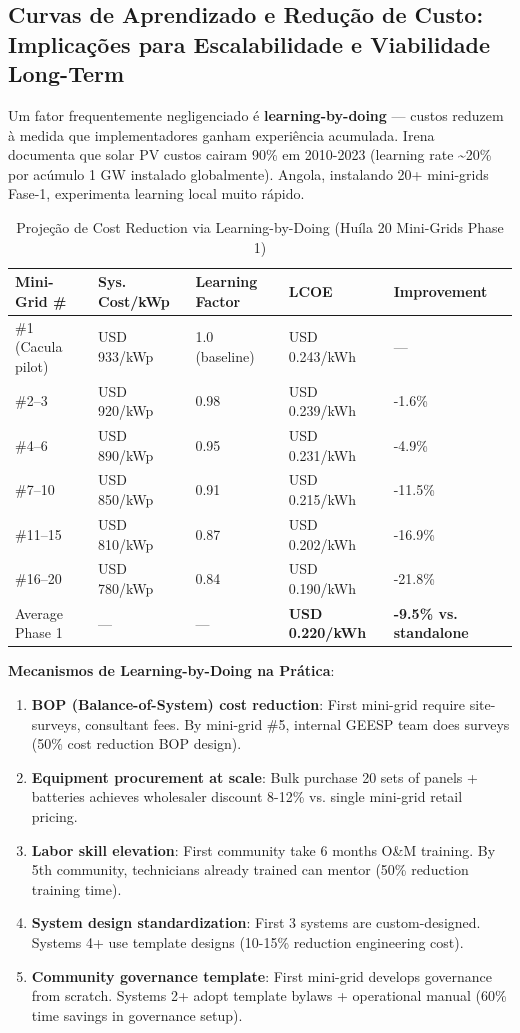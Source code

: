 \documentclass[12pt, a4paper]{article}
\begin{document}
\subsection{Curvas de Aprendizado e Redução de Custo: Implicações para Escalabilidade e Viabilidade Long-Term}

Um fator frequentemente negligenciado é \textbf{learning-by-doing} — custos reduzem à medida que implementadores ganham experiência acumulada. Irena~\citep{IRENA2023a} documenta que solar PV custos cairam 90\% em 2010-2023 (learning rate \textasciitilde 20\% por acúmulo 1 GW instalado globalmente). Angola, instalando 20+ mini-grids Fase-1, experimenta learning local muito rápido.

\begin{table}[H]
\centering
\caption{Projeção de Cost Reduction via Learning-by-Doing (Huíla 20 Mini-Grids Phase 1)}
\label{tab:learning_curve}
\small
\begin{tabular}{|l|l|l|l|l|}
\hline
\textbf{Mini-Grid \#} & \textbf{Sys. Cost/kWp} & \textbf{Learning Factor} & \textbf{LCOE} & \textbf{Improvement} \\
\hline
\#1 (Cacula pilot) & USD 933/kWp & 1.0 (baseline) & USD 0.243/kWh & — \\
\#2–3 & USD 920/kWp & 0.98 & USD 0.239/kWh & -1.6\% \\
\#4–6 & USD 890/kWp & 0.95 & USD 0.231/kWh & -4.9\% \\
\#7–10 & USD 850/kWp & 0.91 & USD 0.215/kWh & -11.5\% \\
\#11–15 & USD 810/kWp & 0.87 & USD 0.202/kWh & -16.9\% \\
\#16–20 & USD 780/kWp & 0.84 & USD 0.190/kWh & -21.8\% \\
\hline
Average Phase 1 & — & — & \textbf{USD 0.220/kWh} & \textbf{-9.5\% vs. standalone} \\
\hline
\end{tabular}
\end{table}

\textbf{Mecanismos de Learning-by-Doing na Prática}:
\begin{enumerate}
\item \textbf{BOP (Balance-of-System) cost reduction}: First mini-grid require site-surveys, consultant fees. By mini-grid \#5, internal GEESP team does surveys (50\% cost reduction BOP design).
\item \textbf{Equipment procurement at scale}: Bulk purchase 20 sets of panels + batteries achieves wholesaler discount 8-12\% vs. single mini-grid retail pricing.
\item \textbf{Labor skill elevation}: First community take 6 months O\&M training. By 5th community, technicians already trained can mentor (50\% reduction training time).
\item \textbf{System design standardization}: First 3 systems are custom-designed. Systems 4+ use template designs (10-15\% reduction engineering cost).
\item \textbf{Community governance template}: First mini-grid develops governance from scratch. Systems 2+ adopt template bylaws + operational manual (60\% time savings in governance setup).
\end{enumerate}
\end{document}

